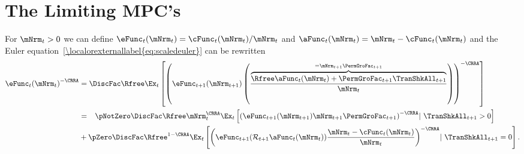 \documentclass[\econtexRoot/BufferStockTheory]{subfiles}
\begin{document}
\hypertarget{The-Limiting-MPCs}{}
\section{The Limiting MPC's}\label{sec:MPCLimits}

For $\mNrm_{t}>0$ we can define $\eFunc_{t}(\mNrm_{t})=\cFunc_{t}(\mNrm_{t})/\mNrm_{t}$ and $\aFunc_{t}(\mNrm_{t})=\mNrm_{t}-\cFunc_{t}(\mNrm_{t})$ and the Euler equation~\eqref{\localorexternallabel{eq:scaledeuler}} can be rewritten
\begin{equation}\begin{gathered}\begin{aligned}
 \eFunc_{t}{(\mNrm_{t})}^{-\CRRA}  & = \DiscFac \Rfree \Ex_{t}\left[{\left(\eFunc_{t+1}({\mNrm}_{t+1})\left(\frac{\overbrace{\Rfree \aFunc_{t}(\mNrm_{t})+{\PermGroFac}_{t+1}{\TranShkAll}_{t+1}}^{=\mNrm_{t+1}\PermGroFac_{t+1}}}{\mNrm_{t}}\right)\right)}^{-\CRRA }\right] \label{eq:eFuncEuler}
\\  & = \phantom{ + }\pNotZero \DiscFac \Rfree \mNrm_{t}^{\CRRA} \Ex_{t}\left[ {\left(\eFunc_{t+1}(\mNrm_{t+1}) \mNrm_{t+1}\PermGroFac_{t+1}\right)}^{-\CRRA} |~ \TranShkAll_{t+1}>0 \right] \notag
\\ &  + \pZero  \DiscFac \Rfree^{1-\CRRA} \Ex_{t}\left[{\left(\eFunc_{t+1}(\mathcal{R}_{t+1}\aFunc_{t}(\mNrm_{t}))\frac{\mNrm_t-\cFunc_{t}(\mNrm_{t})}{\mNrm_{t}}\right)}^{-\CRRA} |~ \TranShkAll_{t+1} = 0 \right]   .
\end{aligned}\end{gathered}\end{equation}
\end{document}
